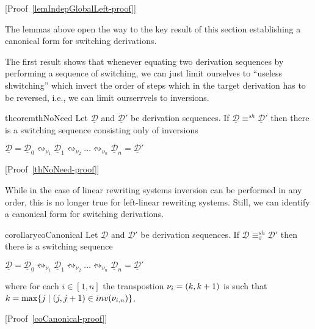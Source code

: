 \documentclass[a4paper,UKenglish,cleveref,pdftex, thm-restate,numberwithinsect,anonymous]{lipics}
\newcommand{\interval}[2][1]{\ensuremath{[{#1},{#2}]}}
\newcommand{\dder}[1]{\mathscr{#1}}
\newcommand{\der}[1]{\underline{\dder{#1}}}
\newcommand{\inv}[1]{\mathsf{inv}({#1})}
\newcommand{\shift}[1]{\ensuremath{\mathrel{{\leftrightsquigarrow}_{#1}}}}
\newcommand{\shifteq}[1][]{\ensuremath{\mathrel{{\equiv}^\mathit{sh}_{#1}}}}
\begin{document}

[Proof~\ref{lemIndepGlobalLeft-proof}]

The lemmas above open the way to the key result of this section establishing a canonical form for
switching derivations.

The first result shows that whenever equating two derivation sequences by performing a sequence of switching, we can just limit ourselves to ``useless shwitching'' which invert the order of steps which in the target derivation has to be reversed, i.e., we can limit ourserrvels to inversions.

\begin{restatable}{theorem}{thNoNeed}
  \label{th:no-need}
  Let $\der{D}$ and $\der{D}'$ be derivation sequences. If $\der{D} \shifteq \der{D}'$ then there is a switching sequence consisting only of inversions
  \begin{center}
    $\der{D} = \der{D}_0 \shift{\nu_1} \der{D}_1 \shift{\nu_2} \ldots
    \shift{\nu_n} \der{D}_n=\der{D}'$
  \end{center}
\end{restatable}

[Proof~\ref{thNoNeed-proof}]

While in the case of linear rewriting systems inversion can be
performed in any order, this is no longer true for left-linear
rewriting systems. Still, we can identify a
canonical form for switching derivations.


\begin{restatable}{corollary}{coCanonical}
  \label{co:canonical}
  Let $\der{D}$ and $\der{D}'$ be derivation sequences. If
  $\der{D} \shifteq[\sigma]\der{D}'$ then there is a switching sequence
  \begin{center}
    $\der{D} = \der{D}_0 \shift{\nu_1} \der{D}_1 \shift{\nu_2} \ldots
    \shift{\nu_n} \der{D}_n=\der{D}'$
  \end{center}
  where for each $i \in \interval{n}$ the transpostion $\nu_i  = \transp{k}$ is such that 
  $k = \max \{ j \mid \transp{j} \in \inv{\nu_{i,n}}\}$.
\end{restatable}

[Proof~\ref{coCanonical-proof}]
\end{document}
